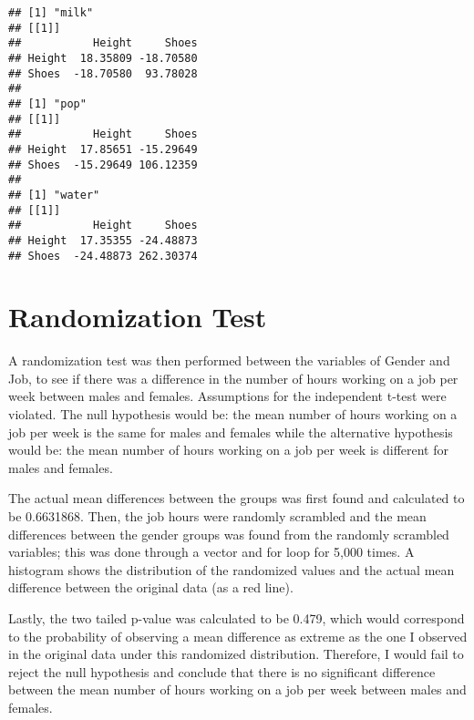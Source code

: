 \documentclass[]{article}
\newenvironment{Shaded}{\begin{snugshade}}{\end{snugshade}}
\newcommand{\DataTypeTok}[1]{\textcolor[rgb]{0.13,0.29,0.53}{#1}}
\newcommand{\KeywordTok}[1]{\textcolor[rgb]{0.13,0.29,0.53}{\textbf{#1}}}
\newcommand{\NormalTok}[1]{#1}
\newcommand{\OperatorTok}[1]{\textcolor[rgb]{0.81,0.36,0.00}{\textbf{#1}}}
\newcommand{\StringTok}[1]{\textcolor[rgb]{0.31,0.60,0.02}{#1}}
\begin{document}
\begin{verbatim}
## [1] "milk"
## [[1]]
##           Height     Shoes
## Height  18.35809 -18.70580
## Shoes  -18.70580  93.78028
## 
## [1] "pop"
## [[1]]
##           Height     Shoes
## Height  17.85651 -15.29649
## Shoes  -15.29649 106.12359
## 
## [1] "water"
## [[1]]
##           Height     Shoes
## Height  17.35355 -24.48873
## Shoes  -24.48873 262.30374
\end{verbatim}

\hypertarget{randomization-test}{%
\section{Randomization Test}\label{randomization-test}}

A randomization test was then performed between the variables of Gender
and Job, to see if there was a difference in the number of hours working
on a job per week between males and females. Assumptions for the
independent t-test were violated. The null hypothesis would be: the mean
number of hours working on a job per week is the same for males and
females while the alternative hypothesis would be: the mean number of
hours working on a job per week is different for males and females.

The actual mean differences between the groups was first found and
calculated to be 0.6631868. Then, the job hours were randomly scrambled
and the mean differences between the gender groups was found from the
randomly scrambled variables; this was done through a vector and for
loop for 5,000 times. A histogram shows the distribution of the
randomized values and the actual mean difference between the original
data (as a red line).

Lastly, the two tailed p-value was calculated to be 0.479, which would
correspond to the probability of observing a mean difference as extreme
as the one I observed in the original data under this randomized
distribution. Therefore, I would fail to reject the null hypothesis and
conclude that there is no significant difference between the mean number
of hours working on a job per week between males and females.

\begin{Shaded}
\end{Shaded}
\end{document}
